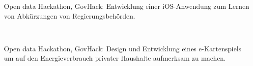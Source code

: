 \documentclass[a4paper]{deedy-resume_twopage} %
\begin{document}
\begin{minipage}[t]{0.66\textwidth}


  Open data Hackathon, GovHack: Entwicklung einer iOS-Anwendung zum Lernen von Abkürzungen von Regierungsbehörden.

  \sectionspace %


   \\

  Open data Hackathon, GovHack: Design und Entwicklung eines e-Kartenspiels um auf den Energieverbrauch privater Haushalte aufmerksam zu machen.
  \sectionspace %





\end{minipage}
\end{document}
